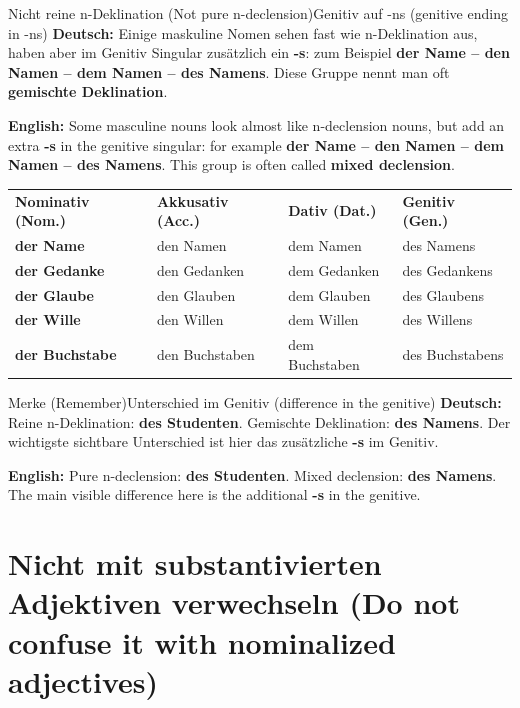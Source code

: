 \documentclass[a4paper,11pt]{article}
\newcommand{\GermanText}[1]{\textbf{Deutsch: }#1\par}
\newcommand{\EnglishText}[1]{{\small\color{SoftGray}\textbf{English: }#1\par}}
\begin{document}
        \begin{grammarentry}{Nicht reine n-Deklination \textnormal{(Not pure n-declension)}}{Genitiv auf -ns \textnormal{(genitive ending in -ns)}}
            \GermanText{Einige maskuline Nomen sehen fast wie n-Deklination aus, haben aber im Genitiv Singular zusätzlich ein \textbf{-s}: zum Beispiel \textbf{der Name -- den Namen -- dem Namen -- des Namens}. Diese Gruppe nennt man oft \textbf{gemischte Deklination}.}
            \EnglishText{Some masculine nouns look almost like n-declension nouns, but add an extra \textbf{-s} in the genitive singular: for example \textbf{der Name -- den Namen -- dem Namen -- des Namens}. This group is often called \textbf{mixed declension}.}
        \end{grammarentry}

        \begin{longtable}{>{\bfseries}p{3.7cm}|p{3.7cm}|p{3.7cm}|p{3.7cm}}
            \rowcolor{HeaderBlueDark}
            \color{white}\textbf{Nominativ (Nom.)} & \color{white}\textbf{Akkusativ (Acc.)} & \color{white}\textbf{Dativ (Dat.)} & \color{white}\textbf{Genitiv (Gen.)} \\
            der Name & den Namen & dem Namen & des Namens \\
            der Gedanke & den Gedanken & dem Gedanken & des Gedankens \\
            der Glaube & den Glauben & dem Glauben & des Glaubens \\
            der Wille & den Willen & dem Willen & des Willens \\
            der Buchstabe & den Buchstaben & dem Buchstaben & des Buchstabens \\
        \end{longtable}

        \begin{grammarentry}{Merke \textnormal{(Remember)}}{Unterschied im Genitiv \textnormal{(difference in the genitive)}}
            \GermanText{Reine n-Deklination: \textbf{des Studenten}. Gemischte Deklination: \textbf{des Namens}. Der wichtigste sichtbare Unterschied ist hier das zusätzliche \textbf{-s} im Genitiv.}
            \EnglishText{Pure n-declension: \textbf{des Studenten}. Mixed declension: \textbf{des Namens}. The main visible difference here is the additional \textbf{-s} in the genitive.}
        \end{grammarentry}

    \section{Nicht mit substantivierten Adjektiven verwechseln \textnormal{(Do not confuse it with nominalized adjectives)}}
\end{document}
